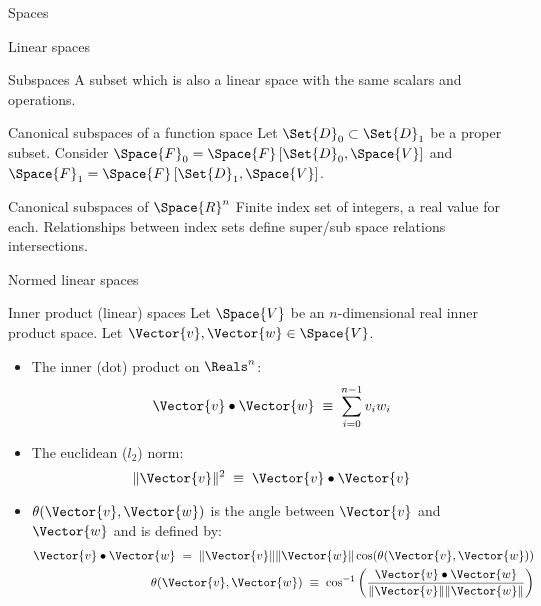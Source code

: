 \begin{plSection}{Spaces}
\begin{plSection}{Linear spaces}
\begin{plSection}{Subspaces}
A subset which is also a linear space with the
same scalars and operations.

\begin{plExample}{Canonical subspaces of a function space}{}
\bigskip
Let $\Set{D}_0 \subset \Set{D}_1$ be a proper subset.
Consider 
$\Space{F}_0 = \Space{F} \left[ \Set{D}_0, \Space{V} \right] $
and
$\Space{F}_1 = \Space{F} \left[ \Set{D}_1, \Space{V} \right] $.
\end{plExample}

\begin{plExample}{Canonical subspaces of $\Space{R}^n$}{}
\bigskip
Finite index set of integers, a real value for each.
Relationships between index sets define super/sub space relations
intersections.
\end{plExample}
\end{plSection}%
\begin{plSection}{Normed linear spaces}
\end{plSection}%
\begin{plSection}{Inner product (linear) spaces}
Let $\Space{V}$ be an $n$-dimensional real inner product space.
Let $\Vector{v}, \Vector{w} \in \Space{V}$.

\begin{itemize}
\item The inner (dot) product on $\Reals^n$:
\begin{equation}
\Vector{v} \bullet \Vector{w} \; \equiv \; \sum_{i=0}^{n-1} v_i w_i
\end{equation}

\item The euclidean ($l_2$) norm:
\begin{equation}
\| \Vector{v} \|^2 \; \equiv \; \Vector{v} \bullet \Vector{v}
\end{equation}

\item $\theta(\Vector{v},\Vector{w})$ 
is the angle between $\Vector{v}$ and $\Vector{w}$
and is defined by:
\begin{eqnarray}
\Vector{v} \bullet \Vector{w} 
\; = \; \| \Vector{v} \| \| \Vector{w} \| 
\cos(\theta(\Vector{v},\Vector{w}))
\\
\theta(\Vector{v},\Vector{w})
\; \equiv \;
\cos^{-1} 
\left(
\frac{ \Vector{v} \bullet \Vector{w} }
{\| \Vector{v} \| \| \Vector{w} \| } 
\right)
\nonumber
\end{eqnarray}


\end{itemize}
\end{plSection}
\end{plSection}
\end{plSection}

